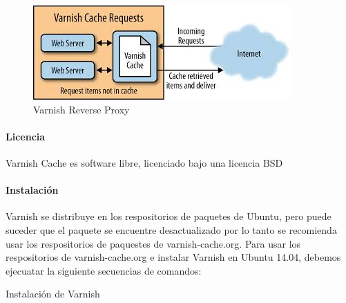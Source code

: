 \begin{figure}[H]
  \includegraphics[width=\linewidth]{src/images/03-capitulo-3/tecnologias/varnish/reverse-proxy.jpg}
  \caption{Varnish Reverse Proxy}
  \label{fig:varnish}
\end{figure}

\paragraph{Licencia}

Varnish Cache es software libre, licenciado bajo una licencia BSD

\paragraph{Instalación}

Varnish se distribuye en los respositorios de paquetes de Ubuntu, pero puede suceder que el paquete se encuentre desactualizado por lo tanto se recomienda usar los respositorios de paquestes de varnish-cache.org.
Para usar los respositorios de varnish-cache.org e instalar Varnish en Ubuntu 14.04, debemos ejecuatar la siguiente secuencias de comandos:

\begin{listing}[H]
  \caption{Instalación de Varnish}
  \label{soa:tecnologias:varnish-cache:bash-preparacion}
\end{listing}
